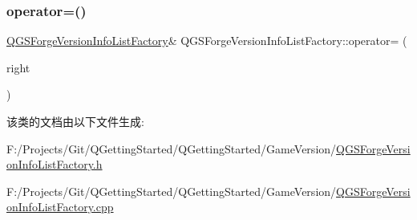 \mbox{\label{class_q_g_s_forge_version_info_list_factory_afa37202022b058e694f0d0bc7672ecaa}} 
\subsubsection{\texorpdfstring{operator=()}{operator=()}\hspace{0.1cm}{\footnotesize\ttfamily [2/2]}}
{\footnotesize\ttfamily \mbox{\hyperlink{class_q_g_s_forge_version_info_list_factory}{Q\+G\+S\+Forge\+Version\+Info\+List\+Factory}}\& Q\+G\+S\+Forge\+Version\+Info\+List\+Factory\+::operator= (\begin{DoxyParamCaption}\item[{\mbox{\hyperlink{class_q_g_s_forge_version_info_list_factory}{Q\+G\+S\+Forge\+Version\+Info\+List\+Factory}} \&\&}]{right }\end{DoxyParamCaption})\hspace{0.3cm}{\ttfamily [delete]}}



该类的文档由以下文件生成\+:\begin{DoxyCompactItemize}
\item 
F\+:/\+Projects/\+Git/\+Q\+Getting\+Started/\+Q\+Getting\+Started/\+Game\+Version/\mbox{\hyperlink{_q_g_s_forge_version_info_list_factory_8h}{Q\+G\+S\+Forge\+Version\+Info\+List\+Factory.\+h}}\item 
F\+:/\+Projects/\+Git/\+Q\+Getting\+Started/\+Q\+Getting\+Started/\+Game\+Version/\mbox{\hyperlink{_q_g_s_forge_version_info_list_factory_8cpp}{Q\+G\+S\+Forge\+Version\+Info\+List\+Factory.\+cpp}}\end{DoxyCompactItemize}
